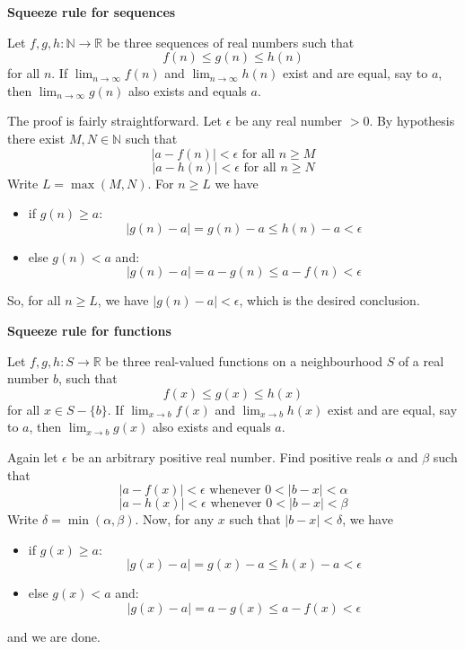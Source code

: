\documentclass[12pt]{article}
\newcommand{\e}{\epsilon}
\newcommand{\N}{\mathbb{N}}
\newcommand{\R}{\mathbb{R}}
\begin{document}
\textbf{Squeeze rule for sequences}

Let $f,g,h:\N\to\R$ be three sequences of real numbers such that
$$f(n)\le g(n)\le h(n)$$
for all $n$. If $\lim_{n\to\infty}f(n)$ and $\lim_{n\to\infty}h(n)$ exist
and are equal, say to $a$, then $\lim_{n\to\infty}g(n)$ also exists and
equals $a$.

The proof is fairly straightforward. Let $\e$ be any real number $>0$.
By hypothesis there exist $M,N\in\N$ such that
$$|a-f(n)|<\e\text{ for all }n\ge M$$
$$|a-h(n)|<\e\text{ for all }n\ge N$$
Write $L=\max(M,N)$. For $n\ge L$ we have
\begin{itemize}
\item if $g(n)\ge a$:
$$|g(n)-a|=g(n)-a\le h(n)-a<\e$$
\item else $g(n)<a$ and:
$$|g(n)-a|=a-g(n)\le a-f(n)<\e$$
\end{itemize}
So, for all $n\ge L$, we have $|g(n)-a|<\e$, which is the desired conclusion.

\textbf{Squeeze rule for functions}

Let $f,g,h:S\to\R$ be three real-valued functions on a neighbourhood
$S$ of a real number $b$, such that $$f(x)\le g(x)\le h(x)$$
for all $x\in S-\{b\}$. If $\lim_{x\to b}f(x)$ and $\lim_{x\to b}h(x)$
exist and are equal, say to $a$, then $\lim_{x\to b}g(x)$ also exists
and equals $a$.

Again let $\e$ be an arbitrary positive real number. Find positive reals
$\alpha$ and $\beta$ such that
$$|a-f(x)|<\e\text{ whenever }0<|b-x|<\alpha$$
$$|a-h(x)|<\e\text{ whenever }0<|b-x|<\beta$$
Write $\delta=\min(\alpha,\beta)$. Now, for any $x$ such that
$|b-x|<\delta$, we have
\begin{itemize}
\item if $g(x)\ge a$:
$$|g(x)-a|=g(x)-a\le h(x)-a<\e$$
\item else $g(x)<a$ and:
$$|g(x)-a|=a-g(x)\le a-f(x)<\e$$
\end{itemize}
and we are done.
\end{document}
